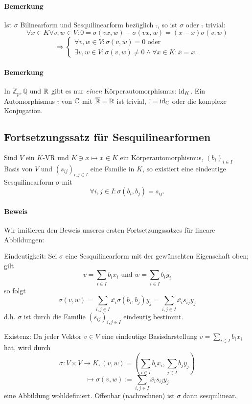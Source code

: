 \paragraph{Bemerkung}
	Ist $ \sigma $ Bilinearform und Sesquilinearform bezüglich $ \bar{.} $, so ist $ \sigma $ oder $ \bar{.} $ trivial:
		\[ \forall x\in K\forall v,w\in V: 0 = \sigma(vx,w) - \sigma(vx,w) = (x-\overline{x})\sigma(v,w)  \]
		\[ \Rightarrow \begin{cases}
		\forall v,w\in V: \sigma(v,w) = 0 \text{ oder}\\
		\exists v,w\in V: \sigma(v,w)\neq 0 \land \forall x\in K: \overline{x} = x.
		\end{cases} \]
\paragraph{Bemerkung}
	In $ \mathbb{Z}_p, \mathbb{Q} $ und $ \mathbb{R} $ gibt es nur \emph{einen} Körperautomorphismus: $ \operatorname{id}_K $. Ein Automorphismus $ \bar{.} $ von $ \mathbb{C} $ mit $ \overline{\mathbb{R}} = \mathbb{R} $ ist trivial, $ \bar{.} = \operatorname{id}_{\mathbb{C}} $ oder die komplexe Konjugation.
	
\subsection{Fortsetzungssatz für Sesquilinearformen}
\begin{Satz}
	Sind $ V $ ein $ K $-VR und $ K\ni x\mapsto \overline{x}\in K $ ein Körperautomorphismus, $ (b_i)_{i\in I} $ Basis von $ V $ und $ (s_{ij})_{i,j\in I} $ eine Familie in $ K $, so existiert eine eindeutige Sesquilinearform $ \sigma $ mit
		\[ \forall i,j\in I:\sigma(b_i,b_j) = s_{ij}. \]
\end{Satz}

\paragraph{Beweis}
	Wir imitieren den Beweis unseres ersten Fortsetzungssatzes für lineare Abbildungen:
	
	{Eindeutigkeit:}
	Sei $ \sigma $ eine Sesquilinearform mit der gewünschten Eigenschaft oben; gilt
		\[ v = \sum_{i\in I}b_ix_i \text{ und }w = \sum_{i\in I}b_i y_i \]
	so folgt
		\[ \sigma(v,w) = \sum_{i,j\in I}\overline{x_i}\sigma(b_i,b_j)y_j = \sum_{i,j\in I}\overline{x_i}s_{ij}y_j \]
	d.h. $ \sigma $ ist durch die Familie $ (s_{ij})_{i,j\in I} $ eindeutig bestimmt.
	
	{Existenz:}
	Da jeder Vektor $ v\in V $ eine eindeutige Basisdarstellung $ v=\sum_{i\in I}b_ix_i $ hat, wird durch
	\[ \sigma:V\times V \to K, (v,w)= \left(\sum_{i\in I}b_ix_i, \sum_{j\in I}b_jy_j\right) \]
	\[ \mapsto \sigma(v,w) := \sum_{i,j\in I}\overline{x_i}s_{ij}y_j \]
	eine Abbildung wohldefiniert. Offenbar (nachrechnen) ist $ \sigma $ dann sesquilinear. 

